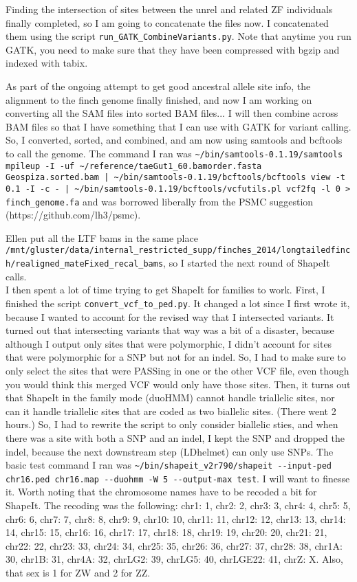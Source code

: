 \documentclass[idxtotoc,hyperref,openany,oneside]{labbook} %
\begin{document}
Finding the intersection of sites between the unrel and related ZF individuals finally completed, so I am going to concatenate the files now. I concatenated them using the script \verb+run_GATK_CombineVariants.py+. Note that anytime you run GATK, you need to make sure that they have been compressed with bgzip and indexed with tabix.

As part of the ongoing attempt to get good ancestral allele site info, the alignment to the finch genome finally finished, and now I am working on converting all the SAM files into sorted BAM files... I will then combine across BAM files so that I have something that I can use with GATK for variant calling. So, I converted, sorted, and combined, and am now using samtools and bcftools to call the genome. The command I ran was \verb+~/bin/samtools-0.1.19/samtools mpileup -I -uf ~/reference/taeGut1_60.bamorder.fasta Geospiza.sorted.bam | ~/bin/samtools-0.1.19/bcftools/bcftools view -t 0.1 -I -c - | ~/bin/samtools-0.1.19/bcftools/vcfutils.pl vcf2fq -l 0 > finch_genome.fa+ and was borrowed liberally from the PSMC suggestion (https://github.com/lh3/psmc).

Ellen put all the LTF bams in the same place \verb+/mnt/gluster/data/internal_restricted_supp/finches_2014/longtailedfinch/realigned_mateFixed_recal_bams+, so I started the next round of ShapeIt calls. \\

I then spent a lot of time trying to get ShapeIt for families to work. First, I finished the script \verb+convert_vcf_to_ped.py+. It changed a lot since I first wrote it, because I wanted to account for the revised way that I intersected variants. It turned out that intersecting variants that way was a bit of a disaster, because although I output only sites that were polymorphic, I didn't account for sites that were polymorphic for a SNP but not for an indel. So, I had to make sure to only select the sites that were PASSing in one or the other VCF file, even though you would think this merged VCF would only have those sites. Then, it turns out that ShapeIt in the family mode (duoHMM) cannot handle triallelic sites, nor can it handle triallelic sites that are coded as two biallelic sites. (There went 2 hours.) So, I had to rewrite the script to only consider biallelic sties, and when there was a site with both a SNP and an indel, I kept the SNP and dropped the indel, because the next downstream step (LDhelmet) can only use SNPs. The basic test command I ran was \verb+~/bin/shapeit_v2r790/shapeit --input-ped chr16.ped chr16.map --duohmm -W 5 --output-max test+. I will want to finesse it. Worth noting that the chromosome names have to be recoded a bit for ShapeIt. The recoding was the following:  chr1: 1, chr2: 2, chr3: 3, chr4: 4, chr5: 5, chr6: 6, chr7: 7, chr8: 8, chr9: 9, chr10: 10, chr11: 11, chr12: 12, chr13: 13, chr14: 14, chr15: 15, chr16: 16, chr17: 17, chr18: 18, chr19: 19, chr20: 20, chr21: 21, chr22: 22, chr23: 33, chr24: 34, chr25: 35, chr26: 36, chr27: 37, chr28: 38, chr1A: 30, chr1B: 31, chr4A: 32, chrLG2: 39, chrLG5: 40, chrLGE22: 41, chrZ: X. Also, that sex is 1 for ZW and 2 for ZZ. \\
\end{document}

